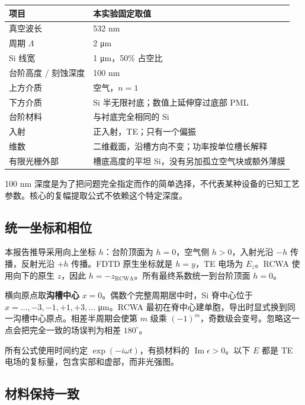 \documentclass[
  chinese,
  UTF8,
  a4paper,
  11pt]{ctexart}
\newcounter{none} %
\begin{document}
{\def\LTcaptype{none} %
\begin{longtable}[]{@{}ll@{}}
\toprule\noalign{}
项目 & 本实验固定取值 \\
\midrule\noalign{}
\endhead
\bottomrule\noalign{}
\endlastfoot
真空波长 & 532 nm \\
周期 \(\Lambda\) & 2 μm \\
Si 线宽 & 1 μm，50\% 占空比 \\
台阶高度 / 刻蚀深度 & 100 nm \\
上方介质 & 空气，\(n=1\) \\
下方介质 & Si 半无限衬底；数值上延伸穿过底部 PML \\
台阶材料 & 与衬底完全相同的 Si \\
入射 & 正入射，TE；只有一个偏振 \\
维数 & 二维截面，沿槽方向不变；功率按单位槽长解释 \\
有限光栅外部 & 槽底高度的平坦 Si，没有另加孤立空气块或额外薄膜 \\
\end{longtable}
}

100 nm
深度是为了把问题完全指定而作的简单选择，不代表某种设备的已知工艺参数。核心的复幅提取公式不依赖这个特定深度。

\subsection{统一坐标和相位}\label{ux7edfux4e00ux5750ux6807ux548cux76f8ux4f4d}

本报告推导采用向上坐标 \(h\)：台阶顶面为 \(h=0\)，空气侧
\(h>0\)，入射光沿 \(-h\) 传播，反射光沿 \(+h\) 传播。FDTD 原生坐标就是
\(h=y\)，TE 电场为 \(E_z\)。RCWA 使用向下的原生 \(z\)，因此
\(h=-z_{\mathrm{RCWA}}\)。所有最终系数统一到台阶顶面 \(h=0\)。

横向原点取\textbf{沟槽中心} \(x=0\)。偶数个完整周期居中时，Si 脊中心位于
\(x=\ldots,-3,-1,+1,+3,\ldots\) μm。RCWA
最初在脊中心建单胞，导出时显式换到同一沟槽中心原点。相差半周期会使第
\(m\) 级乘
\((-1)^m\)，奇数级会变号。忽略这一点会把完全一致的场误判为相差
\(180^\circ\)。

所有公式使用时间约定 \(\exp(-i\omega t)\)，有损材料的
\(\operatorname{Im}\epsilon>0\)。以下 \(E\) 都是 TE
电场的复标量，包含实部和虚部，而非光强图。

\subsection{材料保持一致}\label{ux6750ux6599ux4fddux6301ux4e00ux81f4}
\end{document}
